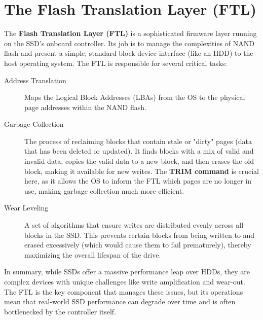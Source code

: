 \section{The Flash Translation Layer (FTL)}
The \textbf{Flash Translation Layer (FTL)} is a sophisticated firmware layer running on the SSD's onboard controller. Its job is to manage the complexities of NAND flash and present a simple, standard block device interface (like an HDD) to the host operating system. The FTL is responsible for several critical tasks:

\begin{description}
    \item[Address Translation] Maps the Logical Block Addresses (LBAs) from the OS to the physical page addresses within the NAND flash.
    \item[Garbage Collection] The process of reclaiming blocks that contain stale or "dirty" pages (data that has been deleted or updated). It finds blocks with a mix of valid and invalid data, copies the valid data to a new block, and then erases the old block, making it available for new writes. The \textbf{TRIM command} is crucial here, as it allows the OS to inform the FTL which pages are no longer in use, making garbage collection much more efficient.
    \item[Wear Leveling] A set of algorithms that ensure writes are distributed evenly across all blocks in the SSD. This prevents certain blocks from being written to and erased excessively (which would cause them to fail prematurely), thereby maximizing the overall lifespan of the drive.
\end{description}

In summary, while SSDs offer a massive performance leap over HDDs, they are complex devices with unique challenges like write amplification and wear-out. The FTL is the key component that manages these issues, but its operations mean that real-world SSD performance can degrade over time and is often bottlenecked by the controller itself.